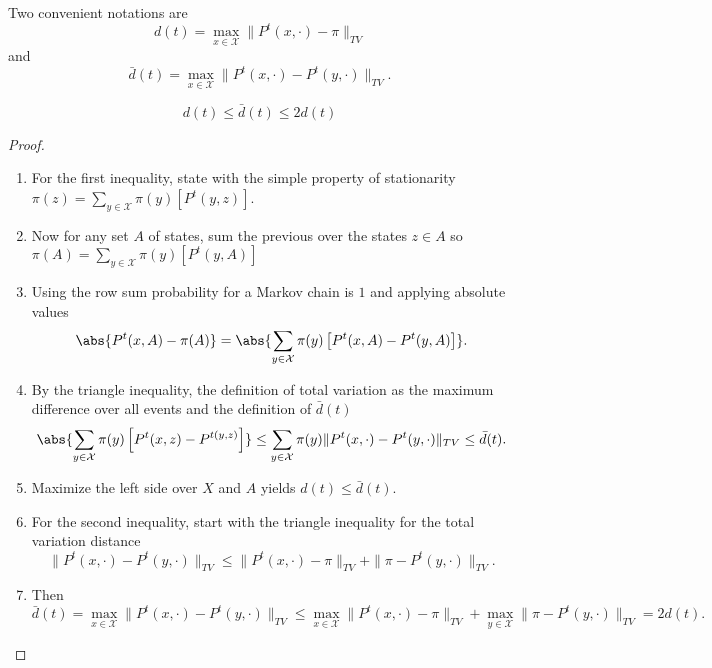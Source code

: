 \documentclass[12pt]{article}
\begin{document}
Two convenient notations are
\[
    d(t) = \max_{x \in \mathcal{X}} \| P^t(x, \cdot) - \pi \|_{TV}
\] and
\[
    \bar{d}(t) = \max_{x \in \mathcal{X}} \| P^t(x, \cdot) - P^t(y,\cdot)\|_
    {TV}.
\]

\begin{lemma}
    \[
        d(t) \le \bar{d}(t) \le 2 d(t)
    \]
\end{lemma}

\begin{proof}
    \begin{enumerate}
        \item
            For the first inequality, state with the simple property of
            stationarity \( \pi(z) = \sum_{y \in \mathcal{X}} \pi(y)
            \left[ P^t(y,z) \right] \).
        \item
            Now for any set \( A \) of states, sum the previous over the
            states \( z \in A \) so \( \pi(A) = \sum_{y \in \mathcal{X}}
            \pi(y) \left[ P^t(y,A) \right] \)
        \item
            Using the row sum probability for a Markov chain is \( 1 \)
            and applying absolute values
            \[
                \abs{P^t(x,A) - \pi(A)} = \abs{\sum_{y \in \mathcal{X}}
                \pi(y) \left[ P^t(x,A) - P^{t}(y,A)\right]}.
            \]
        \item
            By the triangle inequality, the definition of total
            variation as the maximum difference over all events and the
            definition of \( \bar{d}(t) \)
            \[
                \abs{\sum_{y \in \mathcal{X}} \pi(y) \left[ P^t(x,z) - P^
                {t(y,z)}\right]} \le \sum_{y \in \mathcal{X}} \pi(y) \|
                P^t(x,\cdot) - P^t(y,\cdot)\|_{TV} \le \bar{d}(t).
            \]
        \item
            Maximize the left side over \( X \) and \( A \) yields \( d(t)
            \le \bar{d}(t) \).
        \item
            For the second inequality, start with the triangle
            inequality for the total variation distance
            \[
                \| P^t(x, \cdot) - P^t(y,\cdot)\|_{TV} \le \| P^t(x,
                \cdot) - \pi\|_{TV} + \| \pi - P^t(y,\cdot)\|_{TV}.
            \]
        \item
            Then
            \[
                \bar{d}(t) = \max_{x \in \mathcal{X}} \| P^t(x, \cdot) -
                P^t(y,\cdot)\|_{TV} \le \max_{x \in \mathcal{X}}\| P^t(x,
                \cdot) - \pi\|_{TV} + \max_{y \in \mathcal{X}} \| \pi -
                P^t(y,\cdot)\|_{TV} = 2 d(t).
            \]
    \end{enumerate}
\end{proof}
\end{document}
